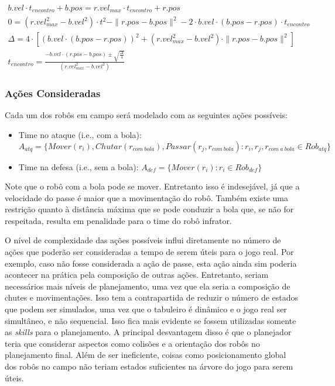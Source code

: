 \begin{gather}  
  b.vel \cdot t_{encontro} + b.pos = r.vel_{max} \cdot t_{encontro} + r.pos\\
  0 = (r.vel^2_{max}-b.vel^2) \cdot t^2 - \parallel r.pos - b.pos \parallel ^2
     - 2 \cdot b.vel \cdot (b.pos - r.pos) \cdot t_{encontro}\\
  \Delta = 4 \cdot [ ( b.vel \cdot (b.pos - r.pos)) ^2 +
           (r.vel_{max}^2 - b.vel^2) \cdot \parallel r.pos - b.pos \parallel ^2]\\
  \boxed{t_{encontro} = \frac{ - b.vel \cdot (r.pos - b.pos) \pm \sqrt {\frac{\Delta}{4}}}
                 {(r.vel^2_{max} - b.vel^2)}}
\end{gather} 

\subsubsection{Ações Consideradas}
Cada um dos robôs em campo será modelado com as seguintes ações possíveis:
\begin{itemize}
  \item Time no ataque (i.e., com a bola):\\
        $A_{atq} = \lbrace Mover(r_i), Chutar(r_{com{\ }bola}), Passar(r_j,r_{com{\ }bola}):
                    r_i, r_j, r_{com{\ }a{\ }bola} \in Rob_{atq}\rbrace$

  \item Time na defesa (i.e., sem a bola):
        $A_{def} = \lbrace Mover(r_i): r_i \in Rob_{def}\rbrace$
\end{itemize}


Note que o robô com a bola pode se mover. Entretanto isso é indesejável, já que
a velocidade do passe é maior que a movimentação do robô. Também existe uma
restrição quanto à distância máxima que se pode conduzir a bola que, se não
for respeitada, resulta em penalidade para o time do robô infrator.

O nível de complexidade das ações possíveis influi diretamente no número de
ações que poderão ser consideradas a tempo de serem úteis para o jogo real. Por
exemplo, caso não fosse considerada a ação de passe, esta ação ainda sim poderia
acontecer na prática pela composição de outras ações. Entretanto, seriam
necessários mais níveis de planejamento, uma vez que ela seria a composição de
chutes e movimentações. Isso tem a contrapartida de reduzir o número de estados
que podem ser simulados, uma vez que o tabuleiro é dinâmico e o jogo real ser
simultâneo, e não sequencial. Isso fica mais evidente se fossem utilizadas
somente as \textit{skills} para o planejamento. A principal desvantagem disso
é que o planejador teria que considerar aspectos como colisões e a orientação
dos robôs no planejamento final. Além de ser ineficiente, coisas como
posicionamento global dos robôs no campo não teriam estados suficientes na
árvore do jogo para serem úteis.

